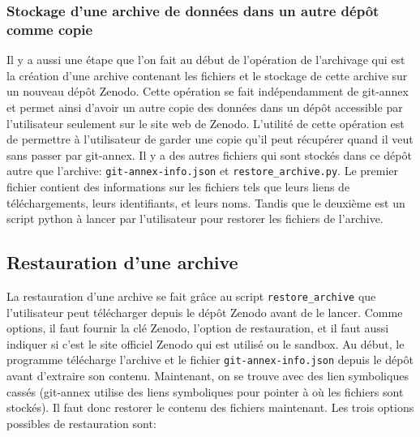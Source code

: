 \documentclass[11pt]{article}
\begin{document}
\subsubsection{Stockage d'une archive de données dans un autre dépôt comme copie}
\label{sec:org384d724}
Il y a aussi une étape que l'on fait au début de l'opération de
l'archivage qui est la création d'une archive contenant les fichiers
et le stockage de cette archive sur un nouveau dépôt Zenodo. 
Cette opération se fait indépendamment de git-annex et permet ainsi
d'avoir un autre copie des données dans un dépôt accessible par
l'utilisateur seulement sur le site web de Zenodo.
L'utilité de cette opération est de permettre à l'utilisateur de
garder une copie qu'il peut récupérer quand il veut sans passer par
git-annex. Il y a des autres fichiers qui sont stockés dans ce dépôt
autre que l'archive: \texttt{git-annex-info.json} et \texttt{restore\_archive.py}. Le
premier fichier contient des informations sur les fichiers tels que
leurs liens de téléchargements, leurs identifiants, et leurs
noms. Tandis que le deuxième est un script python à lancer par
l'utilisateur pour restorer les fichiers de l'archive. 

\subsection{Restauration d'une archive}
\label{sec:org28e1d45}
La restauration d'une archive se fait grâce au script \texttt{restore\_archive}
que l'utilisateur peut télécharger depuis le dépôt Zenodo avant de le
lancer. Comme options, il faut fournir la clé Zenodo, l'option de
restauration, et il faut aussi indiquer si c'est le site officiel
Zenodo qui est utilisé ou le sandbox.
Au début, le programme télécharge l'archive et le fichier
\texttt{git-annex-info.json} depuis le dépôt avant d'extraire son
contenu. Maintenant, on se trouve avec des lien symboliques cassés
(git-annex utilise des liens symboliques pour pointer à où les
fichiers sont stockés). Il faut donc restorer le contenu des fichiers
maintenant. Les trois options possibles de restauration sont:
\end{document}
